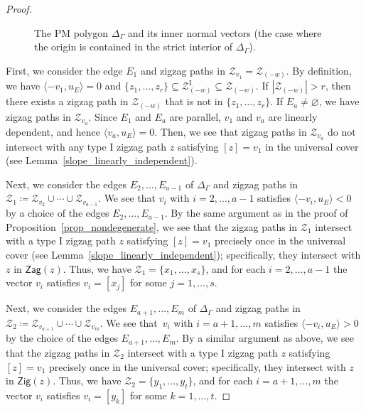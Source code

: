 \documentclass[pdftex]{sigma}%
\numberwithin{equation}{section}
\numberwithin{figure}{section}
\numberwithin{table}{section}
\newcommand{\rmI}{\mathrm{I}}
\newcommand{\calZ}{\mathcal{Z}}
\newcommand{\Zig}{\mathsf{Zig}}
\newcommand{\Zag}{\mathsf{Zag}}
\begin{document}
\begin{proof}
\begin{figure}[h!]
{
}
\caption{The PM polygon $\Delta_\Gamma$ and its inner normal vectors (the case where the origin is contained in the strict interior of $\Delta_\Gamma$).}
\label{PMpolygon_normalvec}
\end{figure}

First, we consider the edge $E_1$ and zigzag paths in $\calZ_{v_1}=\calZ_{(-w)}$.
By definition, we have $\langle -v_1,u_E\rangle=0$ and $\{z_1,\dots,z_r\}\subseteq\calZ_{(-w)}^\rmI\subseteq \calZ_{(-w)}$.
If $|\calZ_{(-w)}|>r$, then there exists a zigzag path in $\calZ_{(-w)}$ that is not in $\{z_1,\dots,z_r\}$.
If $E_a\neq\varnothing$, we have zigzag paths in $\calZ_{v_a}$.
Since $E_1$ and $E_a$ are parallel, $v_1$ and $v_a$ are linearly dependent, and hence $\langle v_a,u_E\rangle=0$.
Then, we see that zigzag paths in $\calZ_{v_a}$ do not intersect with any type I zigzag path $z$ satisfying $[z]=v_1$ in the universal cover (see Lemma~\ref{slope_linearly_independent}).

Next, we consider the edges $E_2,\dots,E_{a-1}$ of $\Delta_\Gamma$ and zigzag paths in $\calZ_1\coloneqq\calZ_{v_2}\cup\cdots\cup\calZ_{v_{a-1}}$.
We see that $v_i$ with $i=2,\dots,a-1$ satisfies $\langle -v_i,u_E\rangle<0$ by a choice of the edges $E_2,\dots,E_{a-1}$.
By the same argument as in the proof of Proposition~\ref{prop_nondegenerate}, we see that
the zigzag paths in $\calZ_1$ intersect with a type I zigzag path $z$ satisfying $[z]=v_1$ precisely once in the universal cover (see Lemma~\ref{slope_linearly_independent}); specifically, they intersect with $z$ in $\Zag(z)$.
Thus, we have $\calZ_1=\{x_1,\dots,x_s\}$, and for each $i=2,\dots ,a-1$ the vector $v_i$ satisfies $v_i=[x_j]$ for some $j=1,\dots,s$.

Next, we consider the edges $E_{a+1},\dots,E_m$ of $\Delta_\Gamma$ and zigzag paths in $\calZ_2\coloneqq\calZ_{v_{a+1}}\cup\cdots\allowbreak\cup\calZ_{v_m}$.
We see that~$v_i$ with $i=a+1,\dots,m$ satisfies $\langle -v_i,u_E\rangle>0$ by the choice of the edges $E_{a+1},\dots,E_m$.
By a similar argument as above, we see that the zigzag paths in $\calZ_2$ intersect with a type I zigzag path $z$ satisfying $[z]=v_1$ precisely once in the universal cover; specifically, they intersect with $z$ in $\Zig(z)$.
Thus, we have $\calZ_2=\{y_1,\dots,y_t\}$, and for each $i=a+1,\dots,m$ the vector $v_i$ satisfies $v_i=[y_k]$ for some $k=1,\dots,t$.


\end{proof}
\end{document}
